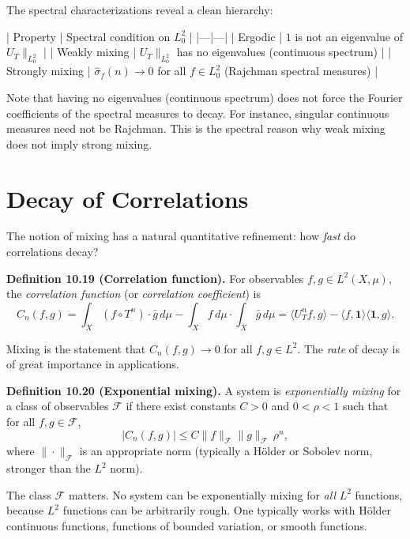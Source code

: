 \begin{remark}
The spectral characterizations reveal a clean hierarchy:

| Property | Spectral condition on $L^2_0$ |
|---|---|
| Ergodic | $1$ is not an eigenvalue of $U_T\|_{L^2_0}$ |
| Weakly mixing | $U_T\|_{L^2_0}$ has no eigenvalues (continuous spectrum) |
| Strongly mixing | $\hat{\sigma}_f(n) \to 0$ for all $f \in L^2_0$ (Rajchman spectral measures) |

Note that having no eigenvalues (continuous spectrum) does not force the Fourier coefficients of the spectral measures to decay. For instance, singular continuous measures need not be Rajchman. This is the spectral reason why weak mixing does not imply strong mixing.
\end{remark}


\section{Decay of Correlations}\label{sec:10.6}

The notion of mixing has a natural quantitative refinement: how \textit{fast} do correlations decay?

\textbf{Definition 10.19 (Correlation function).} For observables $f, g \in L^2(X, \mu)$, the \textit{correlation function} (or \textit{correlation coefficient}) is
\begin{equation}\label{eq:10.8}\tag{10.8}
C_n(f, g) = \int_X (f \circ T^n) \cdot \bar{g} \, d\mu - \int_X f \, d\mu \cdot \int_X \bar{g} \, d\mu = \langle U_T^n f, g \rangle - \langle f, \mathbf{1}\rangle \langle \mathbf{1}, g\rangle.
\end{equation}

Mixing is the statement that $C_n(f,g) \to 0$ for all $f, g \in L^2$. The \textit{rate} of decay is of great importance in applications.

\textbf{Definition 10.20 (Exponential mixing).} A system is \textit{exponentially mixing} for a class of observables $\mathcal{F}$ if there exist constants $C > 0$ and $0 < \rho < 1$ such that for all $f, g \in \mathcal{F}$,
\begin{equation}\label{eq:10.9}\tag{10.9}
|C_n(f, g)| \le C \|f\|_{\mathcal{F}} \|g\|_{\mathcal{F}} \, \rho^n,
\end{equation}
where $\|\cdot\|_{\mathcal{F}}$ is an appropriate norm (typically a Hölder or Sobolev norm, stronger than the $L^2$ norm).

\begin{remark}
The class $\mathcal{F}$ matters. No system can be exponentially mixing for \textit{all} $L^2$ functions, because $L^2$ functions can be arbitrarily rough. One typically works with Hölder continuous functions, functions of bounded variation, or smooth functions.
\end{remark}


